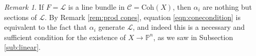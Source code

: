 \documentclass[12pt]{amsart}
\numberwithin{equation}{section}
\newtheorem{proposition}[theorem]{Proposition}
\theoremstyle{definition}
\theoremstyle{remark}
\newtheorem{remark}[theorem]{Remark}
\DeclareMathOperator{\Hom}{Hom}
\newcommand{\PP}{\mathbb{P}}
\newcommand{\cat}{\mathcal{C}}
\newcommand{\CL}{\mathcal{L}}
\renewcommand{\1}{\mathbf{1}}
\newcommand{\coh}{\mathrm{Coh}}
\newcommand{\End}{\mathrm{End}}
\begin{document}
\begin{remark}
If $F = \CL$ is a line bundle in $\cat=\coh(X)$, then $\alpha_i$ are nothing but sections of $\CL$.
By Remark \ref{rem:prod cones}, equation \eqref{eqn:conecondition} is equivalent to the fact that $\alpha_i$ generate $\CL$, and indeed this is a necessary and sufficient condition for the existence of $X \rightarrow \PP^n$, as we saw in Subsection \ref{sub:linear}.
\end{remark}



\end{document}

